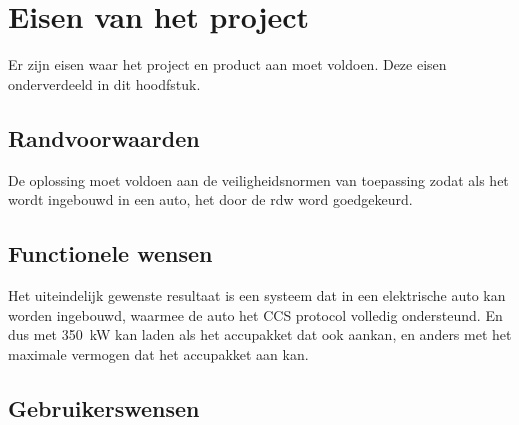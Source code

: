 \chapter{Eisen van het project}
\label{Eisen_van_het_project}

Er zijn eisen waar het project en product aan moet voldoen. Deze eisen
onderverdeeld in dit hoodfstuk.

\section{Randvoorwaarden}

De oplossing moet voldoen aan de veiligheidsnormen van toepassing zodat als het
wordt ingebouwd in een auto, het door de \ac{rdw} word goedgekeurd.

\section{Functionele wensen}

Het uiteindelijk gewenste resultaat is een systeem dat in een elektrische auto
kan worden ingebouwd, waarmee de auto het CCS protocol volledig ondersteund. En
dus met \si{350\kilo\watt} kan laden als het accupakket dat ook aankan, en
anders met het maximale vermogen dat het accupakket aan kan.

\section{Gebruikerswensen}

